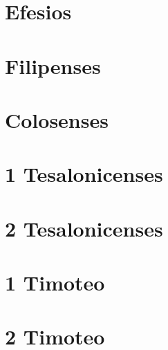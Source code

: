 \chapter{Efesios}
\begin{multicols}{2}
  \parskip=0pt \relax
  
\end{multicols}

\chapter{Filipenses}
\begin{multicols}{2}
  \parskip=0pt \relax
  
\end{multicols}

\chapter{Colosenses}
\begin{multicols}{2}
  \parskip=0pt \relax
  
\end{multicols}

\chapter{1 Tesalonicenses}
\begin{multicols}{2}
  \parskip=0pt \relax
  
\end{multicols}

\chapter{2 Tesalonicenses}
\begin{multicols}{2}
  \parskip=0pt \relax
  
\end{multicols}

\chapter{1 Timoteo}
\begin{multicols}{2}
  \parskip=0pt \relax
  
\end{multicols}

\chapter{2 Timoteo}
\begin{multicols}{2}
  \parskip=0pt \relax
  
\end{multicols}


